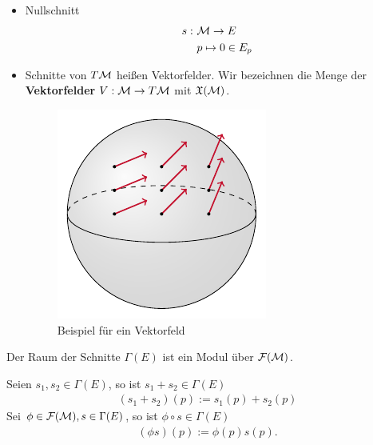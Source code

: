 \begin{bsp}[Schnitte] \leavevmode
\begin{itemize}
\item Nullschnitt
\begin{align*}
s : \ & \mathcal{M} \to E \\
&p \mapsto 0 \in E_p
\end{align*}
\item Schnitte von $T\mathcal{M}$ heißen Vektorfelder.
Wir bezeichnen die Menge der \textbf{Vektorfelder} $V: \mathcal{M} \to T\mathcal{M}$ mit $\mathfrak{X}(\mathcal{M})$.
\begin{figure}[h]
\centering
\includegraphics[width=0.4\linewidth]{figures/tikz/vectorfield_on_manifold.pdf}
\caption{Beispiel für ein Vektorfeld}
\label{img:bspvektorfeld}
\end{figure} 
\end{itemize}
\end{bsp}
\begin{satz}
\label{satz:SchnitteModul}
Der Raum der Schnitte $\Gamma (E)$ ist ein Modul über $\mathcal{F}(\mathcal{M})$.
\end{satz}
\begin{bew}
Seien $s_1, s_2 \in \Gamma (E)$, so ist $s_1 + s_2 \in \Gamma (E)$
\begin{align}
(s_1 + s_2)(p) := s_1 (p) + s_2 (p)
\end{align}
Sei $\phi \in \mathcal{F}(\mathcal{M}), s\in \Gamma(E)$, so ist $\phi \circ s \in \Gamma (E)$
\begin{align}
(\phi  s) (p) := \phi (p) s(p).
\end{align}
\end{bew}


